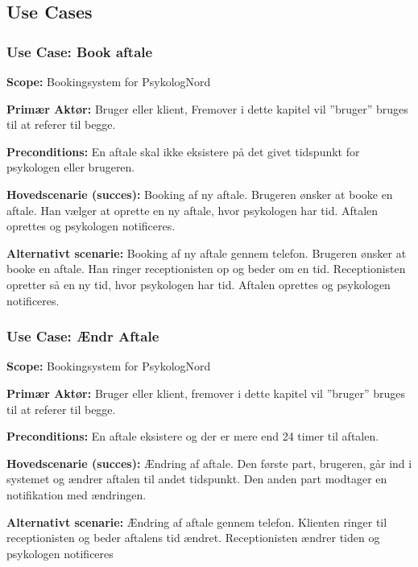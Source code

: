 \subsection{Use Cases}

\subsubsection{Use Case: Book aftale}
{\setlength{\parindent}{0cm}
\textbf{Scope:} Bookingsystem for PsykologNord

\textbf{Primær Aktør:} Bruger eller klient, Fremover i dette kapitel vil ”bruger” bruges til at referer til begge.

\textbf{Preconditions:} En aftale skal ikke eksistere på det givet tidspunkt for psykologen eller brugeren.

\textbf{Hovedscenarie (succes):} Booking af ny aftale.
Brugeren ønsker at booke en aftale. Han vælger at oprette en ny aftale, hvor psykologen har tid. Aftalen oprettes og psykologen notificeres.

\textbf{Alternativt scenarie:} Booking af ny aftale gennem telefon.
Brugeren ønsker at booke en aftale. Han ringer receptionisten op og beder om en tid. Receptionisten opretter så en ny tid, hvor psykologen har tid. Aftalen oprettes og psykologen notificeres.
}

\subsubsection{Use Case: Ændr Aftale}
{\setlength{\parindent}{0cm}
\textbf{Scope:} Bookingsystem for PsykologNord

\textbf{Primær Aktør:} Bruger eller klient, fremover i dette kapitel vil ”bruger” bruges til at referer til begge. 

\textbf{Preconditions:} En aftale eksistere og der er mere end 24 timer til aftalen.

\textbf{Hovedscenarie (succes):} Ændring af aftale.
Den første part, brugeren, går ind i systemet og ændrer aftalen til andet tidspunkt. Den anden part modtager en notifikation med ændringen. 

\textbf{Alternativt scenarie:} Ændring af aftale gennem telefon.
Klienten ringer til receptionisten og beder aftalens tid ændret. Receptionisten ændrer tiden og psykologen notificeres
}
